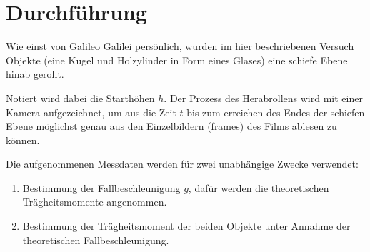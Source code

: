\section{Durchführung}
\label{sec:Durchführung}

Wie einst von Galileo Galilei \cite[232]{galilei1623} persönlich, wurden im hier beschriebenen Versuch
Objekte (eine Kugel und  Holzylinder in Form eines Glases) eine schiefe Ebene hinab gerollt.

Notiert wird dabei die Starthöhen $h$. Der Prozess des Herabrollens wird mit einer Kamera 
aufgezeichnet, um aus die Zeit $t$ bis zum erreichen des Endes der schiefen Ebene möglichst genau
aus den Einzelbildern (frames) des Films ablesen zu können.

Die aufgenommenen Messdaten werden für zwei unabhängige Zwecke verwendet:

\begin{enumerate}
  \item {Bestimmung der Fallbeschleunigung $g$, dafür werden 
        die theoretischen Trägheitsmomente angenommen.}
  \item {Bestimmung der Trägheitsmoment der beiden Objekte unter Annahme der theoretischen 
        Fallbeschleunigung.}
\end{enumerate}


